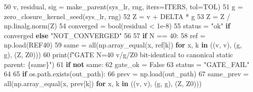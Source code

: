 \documentclass[
  a4paper,
]{ltjsarticle}
\newenvironment{Shaded}{}{}
\newcommand{\BuiltInTok}[1]{\textcolor[rgb]{0.00,0.50,0.00}{#1}}
\newcommand{\ControlFlowTok}[1]{\textcolor[rgb]{0.00,0.44,0.13}{\textbf{#1}}}
\newcommand{\DecValTok}[1]{\textcolor[rgb]{0.25,0.63,0.44}{#1}}
\newcommand{\FloatTok}[1]{\textcolor[rgb]{0.25,0.63,0.44}{#1}}
\newcommand{\KeywordTok}[1]{\textcolor[rgb]{0.00,0.44,0.13}{\textbf{#1}}}
\newcommand{\NormalTok}[1]{#1}
\newcommand{\OperatorTok}[1]{\textcolor[rgb]{0.40,0.40,0.40}{#1}}
\newcommand{\SpecialCharTok}[1]{\textcolor[rgb]{0.25,0.44,0.63}{#1}}
\newcommand{\SpecialStringTok}[1]{\textcolor[rgb]{0.73,0.40,0.53}{#1}}
\newcommand{\StringTok}[1]{\textcolor[rgb]{0.25,0.44,0.63}{#1}}
\newcommand{\VariableTok}[1]{\textcolor[rgb]{0.10,0.09,0.49}{#1}}
\begin{document}
\begin{Shaded}
\begin{Highlighting}[]
    \DecValTok{50}\NormalTok{          v, residual, sig }\OperatorTok{=}\NormalTok{ make\_parent(sys\_lr, rng, iters}\OperatorTok{=}\NormalTok{ITERS, tol}\OperatorTok{=}\NormalTok{TOL)}
    \DecValTok{51}\NormalTok{          g }\OperatorTok{=}\NormalTok{ zero\_closure\_kernel\_seed(sys\_lr, rng)}
    \DecValTok{52}\NormalTok{          Z }\OperatorTok{=}\NormalTok{ v }\OperatorTok{+}\NormalTok{ DELTA }\OperatorTok{*}\NormalTok{ g}
    \DecValTok{53}\NormalTok{          Z }\OperatorTok{=}\NormalTok{ Z }\OperatorTok{/}\NormalTok{ np.linalg.norm(Z)}
    \DecValTok{54}\NormalTok{          converged }\OperatorTok{=} \BuiltInTok{bool}\NormalTok{(residual }\OperatorTok{\textless{}} \FloatTok{1e{-}8}\NormalTok{)}
    \DecValTok{55}\NormalTok{          status }\OperatorTok{=} \StringTok{"ok"} \ControlFlowTok{if}\NormalTok{ converged }\ControlFlowTok{else} \StringTok{"NOT\_CONVERGED"}
    \DecValTok{56}
    \DecValTok{57}          \ControlFlowTok{if}\NormalTok{ N }\OperatorTok{==} \DecValTok{40}\NormalTok{:}
    \DecValTok{58}\NormalTok{              ref }\OperatorTok{=}\NormalTok{ np.load(REF40)}
    \DecValTok{59}\NormalTok{              same }\OperatorTok{=} \BuiltInTok{all}\NormalTok{(np.array\_equal(x, ref[k]) }\ControlFlowTok{for}\NormalTok{ x, k }\KeywordTok{in}\NormalTok{ ((v, }\StringTok{\textquotesingle{}v\textquotesingle{}}\NormalTok{), (g, }\StringTok{\textquotesingle{}g\textquotesingle{}}\NormalTok{), (Z, }\StringTok{\textquotesingle{}Z0\textquotesingle{}}\NormalTok{)))}
    \DecValTok{60}              \BuiltInTok{print}\NormalTok{(}\SpecialStringTok{f"GATE N=40 v/g/Z0 bit{-}identical to canonical static parent: }\SpecialCharTok{\{}\NormalTok{same}\SpecialCharTok{\}}\SpecialStringTok{"}\NormalTok{)}
    \DecValTok{61}              \ControlFlowTok{if} \KeywordTok{not}\NormalTok{ same:}
    \DecValTok{62}\NormalTok{                  gate\_ok }\OperatorTok{=} \VariableTok{False}
    \DecValTok{63}\NormalTok{                  status }\OperatorTok{=} \StringTok{"GATE\_FAIL"}
    \DecValTok{64}
    \DecValTok{65}          \ControlFlowTok{if}\NormalTok{ os.path.exists(out\_path):}
    \DecValTok{66}\NormalTok{              prev }\OperatorTok{=}\NormalTok{ np.load(out\_path)}
    \DecValTok{67}\NormalTok{              same\_prev }\OperatorTok{=} \BuiltInTok{all}\NormalTok{(np.array\_equal(x, prev[k]) }\ControlFlowTok{for}\NormalTok{ x, k }\KeywordTok{in}\NormalTok{ ((v, }\StringTok{\textquotesingle{}v\textquotesingle{}}\NormalTok{), (g, }\StringTok{\textquotesingle{}g\textquotesingle{}}\NormalTok{), (Z, }\StringTok{\textquotesingle{}Z0\textquotesingle{}}\NormalTok{)))}

\end{Highlighting}
\end{Shaded}
\end{document}
